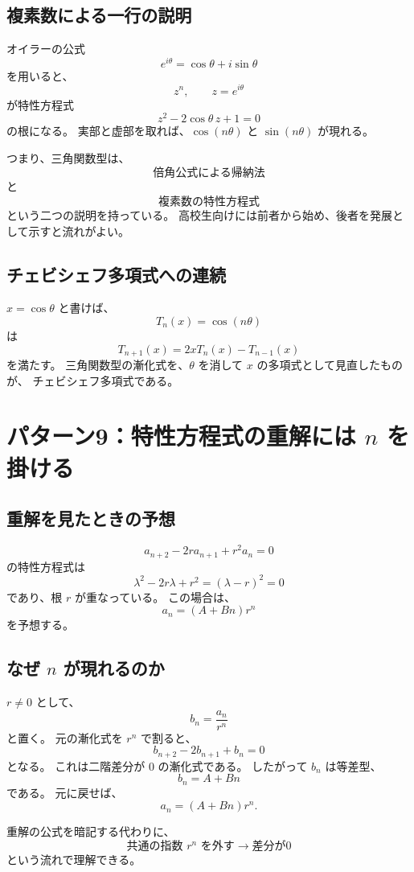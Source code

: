 \subsection{複素数による一行の説明}

オイラーの公式
\[
  e^{i\theta}=\cos\theta+i\sin\theta
\]
を用いると、
\[
  z^n,\qquad z=e^{i\theta}
\]
が特性方程式
\[
  z^2-2\cos\theta\,z+1=0
\]
の根になる。
実部と虚部を取れば、$\cos(n\theta)$ と $\sin(n\theta)$ が現れる。

つまり、三角関数型は、
\[
  \text{倍角公式による帰納法}
\]
と
\[
  \text{複素数の特性方程式}
\]
という二つの説明を持っている。
高校生向けには前者から始め、後者を発展として示すと流れがよい。

\subsection{チェビシェフ多項式への連続}

$x=\cos\theta$ と書けば、
\[
  T_n(x)=\cos(n\theta)
\]
は
\[
  T_{n+1}(x)=2xT_n(x)-T_{n-1}(x)
\]
を満たす。
三角関数型の漸化式を、$\theta$ を消して $x$ の多項式として見直したものが、
チェビシェフ多項式である。

\section{パターン9：特性方程式の重解には $n$ を掛ける}

\subsection{重解を見たときの予想}

\[
  a_{n+2}-2r a_{n+1}+r^2a_n=0
\]
の特性方程式は
\[
  \lambda^2-2r\lambda+r^2=(\lambda-r)^2=0
\]
であり、根 $r$ が重なっている。
この場合は、
\[
  a_n=(A+Bn)r^n
\]
を予想する。

\subsection{なぜ $n$ が現れるのか}

$r\neq0$ として、
\[
  b_n=\frac{a_n}{r^n}
\]
と置く。
元の漸化式を $r^{n}$ で割ると、
\[
  b_{n+2}-2b_{n+1}+b_n=0
\]
となる。
これは二階差分が $0$ の漸化式である。
したがって $b_n$ は等差型、
\[
  b_n=A+Bn
\]
である。
元に戻せば、
\[
  a_n=(A+Bn)r^n.
\]

重解の公式を暗記する代わりに、
\[
  \text{共通の指数 }r^n\text{ を外す}
  \longrightarrow
  \text{差分が0}
\]
という流れで理解できる。

